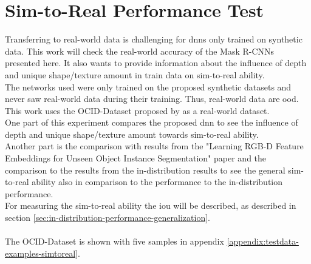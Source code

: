 	
	
	\section{Sim-to-Real Performance Test}
	\label{sec:simt-to-real-performance-test}
		Transferring to real-world data is challenging for \ac{dnn}s only trained on synthetic data. This work will check the real-world accuracy of the Mask R-CNNs presented here. It also wants to provide information about the influence of depth and unique shape/texture amount in train data on sim-to-real ability.\\
		The networks used were only trained on the proposed synthetic datasets and never saw real-world data during their training. Thus, real-world data are \acl{ood}. This work uses the OCID-Dataset proposed by \citeauthor{Suchi2019} as a real-world dataset.\\
		One part of this experiment compares the proposed \ac{dnn} to see the influence of depth and unique shape/texture amount towards sim-to-real ability.\\
		Another part is the comparison with results from the "Learning RGB-D Feature Embeddings for Unseen Object Instance Segmentation" \cite{Xiang2021} paper and the comparison to the results from the in-distribution results to see the general sim-to-real ability also in comparison to the performance to the in-distribution performance.\\
		For measuring the sim-to-real ability the \ac{iou} will be described, as described in section \ref{sec:in-distribution-performance-generalization}.\\
		\\
		The OCID-Dataset is shown with five samples in appendix \ref{appendix:testdata-examples-simtoreal}.
	
	
	
	
	
	
	
	
	


